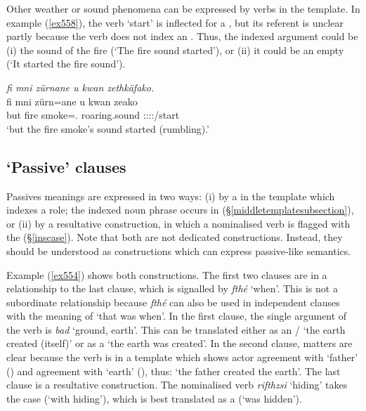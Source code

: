 Other weather or sound phenomena can be expressed by verbs in the  template. In example (\ref{ex558}), the verb `start' is inflected for a \Stsg{} , but its referent is unclear \textendash{} partly because the verb does not index an . Thus, the indexed argument could be (i) the sound of the fire (`The fire sound started'), or (ii) it could be an empty  (`It started the fire sound').

\begin{exe}
	\ex \emph{fi mni zürnane u kwan zethkäfako.}\\
	\gll fi mni zürn=ane {u kwan} zeako\\
	but fire smoke=\Poss.{\Sg} {roaring.sound} \Sg:\Sbj:\Pst:\Pfv:\Andat/start\\
	\trans `but the fire smoke's sound started (rumbling).'
	\label{ex558}
\end{exe}

\subsection{`Passive' clauses}\label{passiveclause}

Passives meanings are expressed in two ways: (i) by a  in the  template which indexes a  role; the indexed noun phrase occurs in   ({\S}\ref{middletemplatesubsection}), or (ii) by a resultative construction, in which a nominalised verb is flagged with the   ({\S}\ref{inscase}). Note that both are not dedicated  constructions. Instead, they should be understood as constructions which can express passive-like semantics.

Example (\ref{ex554}) shows both constructions. The first two clauses are in a  relationship to the last clause, which is signalled by \emph{fthé} `when'. This is not a subordinate relationship because \emph{fthé} can also be used in independent clauses with the meaning of `that was when'. In the first clause, the single argument of the verb is \emph{bad} `ground, earth'. This can be translated either as an / `the earth created (itself)' or as a  `the earth was created'. In the second clause, matters are clear because the verb is in a  template which shows actor agreement with `father' (\Erg) and  agreement with `earth' (\Abs), thus: `the father created the earth'. The last clause is a resultative construction. The nominalised verb \emph{rifthzsi} `hiding' takes the  case (`with hiding'), which is best translated as a  (`was hidden').

